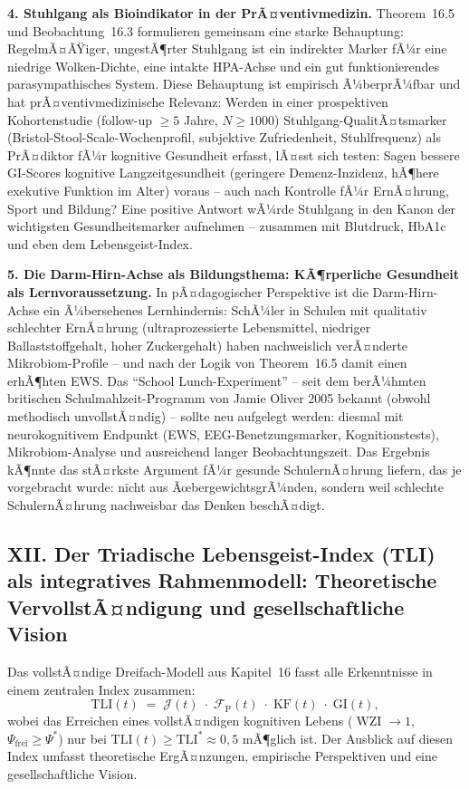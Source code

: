 ﻿\documentclass[12pt,a4paper]{report}
\theoremstyle{plain}
\theoremstyle{definition}
\theoremstyle{remark}
\DeclareMathOperator{\WZI}{WZI}
\begin{document}
	\textbf{4. Stuhlgang als Bioindikator in der PrÃ¤ventivmedizin.}
	Theorem~16.5 und Beobachtung~16.3 formulieren gemeinsam eine
	starke Behauptung: RegelmÃ¤ÃŸiger, ungestÃ¶rter Stuhlgang ist
	ein indirekter Marker fÃ¼r eine niedrige Wolken-Dichte,
	eine intakte HPA-Achse und ein gut funktionierendes
	parasympathisches System.
	Diese Behauptung ist empirisch Ã¼berprÃ¼fbar und hat
	prÃ¤ventivmedizinische Relevanz: Werden in einer prospektiven
	Kohortenstudie (follow-up $\geq 5$ Jahre, $N \geq 1000$)
	Stuhlgang-QualitÃ¤tsmarker (Bristol-Stool-Scale-Wochenprofil,
	subjektive Zufriedenheit, Stuhlfrequenz) als PrÃ¤diktor fÃ¼r
	kognitive Gesundheit erfasst, lÃ¤sst sich testen:
	Sagen bessere GI-Scores kognitive Langzeitgesundheit
	(geringere Demenz-Inzidenz, hÃ¶here exekutive Funktion im Alter)
	voraus -- auch nach Kontrolle fÃ¼r ErnÃ¤hrung, Sport und Bildung?
	Eine positive Antwort wÃ¼rde Stuhlgang in den Kanon der
	wichtigsten Gesundheitsmarker aufnehmen -- zusammen mit Blutdruck,
	HbA1c und eben dem Lebensgeist-Index.

	\textbf{5. Die Darm-Hirn-Achse als Bildungsthema: KÃ¶rperliche
		Gesundheit als Lernvoraussetzung.}
	In pÃ¤dagogischer Perspektive ist die Darm-Hirn-Achse ein
	Ã¼bersehenes Lernhindernis:
	SchÃ¼ler in Schulen mit qualitativ schlechter ErnÃ¤hrung
	(ultraprozessierte Lebensmittel, niedriger Ballaststoffgehalt,
	hoher Zuckergehalt) haben nachweislich verÃ¤nderte Mikrobiom-Profile --
	und nach der Logik von Theorem~16.5 damit einen erhÃ¶hten EWS.
	Das ``School Lunch-Experiment'' -- seit dem berÃ¼hmten
	britischen Schulmahlzeit-Programm von Jamie Oliver 2005
	bekannt (obwohl methodisch unvollstÃ¤ndig) --
	sollte neu aufgelegt werden: diesmal mit neurokognitivem
	Endpunkt (EWS, EEG-Benetzungsmarker, Kognitionstests),
	Mikrobiom-Analyse und ausreichend langer Beobachtungszeit.
	Das Ergebnis kÃ¶nnte das stÃ¤rkste Argument fÃ¼r
	gesunde SchulernÃ¤hrung liefern, das je vorgebracht wurde:
	nicht aus ÃœbergewichtsgrÃ¼nden, sondern weil schlechte
	SchulernÃ¤hrung nachweisbar das Denken beschÃ¤digt.

	\subsection*{XII. Der Triadische Lebensgeist-Index (TLI)
		als integratives Rahmenmodell: Theoretische VervollstÃ¤ndigung
		und gesellschaftliche Vision}

	Das vollstÃ¤ndige Dreifach-Modell aus Kapitel~16 fasst alle
	Erkenntnisse in einem zentralen Index zusammen:
	\[
	\mathrm{TLI}(t)
	\;=\;
	\mathcal{J}(t)\;\cdot\;\mathcal{F}_{\mathrm{P}}(t)
	\;\cdot\;\mathrm{KF}(t)\;\cdot\;\mathrm{GI}(t),
	\]
	wobei das Erreichen eines vollstÃ¤ndigen kognitiven Lebens
	($\WZI \to 1$, $\Psi_{\mathrm{frei}} \geq \Psi^*$)
	nur bei $\mathrm{TLI}(t) \geq \mathrm{TLI}^* \approx 0{,}5$ mÃ¶glich ist.
	Der Ausblick auf diesen Index umfasst theoretische ErgÃ¤nzungen,
	empirische Perspektiven und eine gesellschaftliche Vision.
\end{document}

